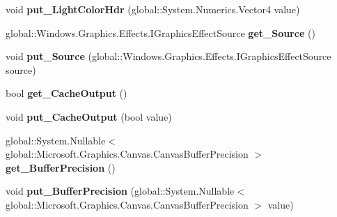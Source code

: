\begin{DoxyCompactItemize}
void {\bfseries put\+\_\+\+Light\+Color\+Hdr} (global\+::\+System.\+Numerics.\+Vector4 value)
\item 
\mbox{\label{class_microsoft_1_1_graphics_1_1_canvas_1_1_effects_1_1_distant_diffuse_effect_a281ce3e909dbd3d657de772dd7cf9a88}} 
global\+::\+Windows.\+Graphics.\+Effects.\+I\+Graphics\+Effect\+Source {\bfseries get\+\_\+\+Source} ()
\item 
\mbox{\label{class_microsoft_1_1_graphics_1_1_canvas_1_1_effects_1_1_distant_diffuse_effect_ae46b17e7bfeb38d1a8a97d17417e0b44}} 
void {\bfseries put\+\_\+\+Source} (global\+::\+Windows.\+Graphics.\+Effects.\+I\+Graphics\+Effect\+Source source)
\item 
\mbox{\label{class_microsoft_1_1_graphics_1_1_canvas_1_1_effects_1_1_distant_diffuse_effect_ad2e1204fd4a5c7fc0fd34308e55a8e9d}} 
bool {\bfseries get\+\_\+\+Cache\+Output} ()
\item 
\mbox{\label{class_microsoft_1_1_graphics_1_1_canvas_1_1_effects_1_1_distant_diffuse_effect_afa1c000af71fd3890693cc34c38419c1}} 
void {\bfseries put\+\_\+\+Cache\+Output} (bool value)
\item 
\mbox{\label{class_microsoft_1_1_graphics_1_1_canvas_1_1_effects_1_1_distant_diffuse_effect_ac89cdd4b51db6b60cc4c4aeae373a36a}} 
global\+::\+System.\+Nullable$<$ global\+::\+Microsoft.\+Graphics.\+Canvas.\+Canvas\+Buffer\+Precision $>$ {\bfseries get\+\_\+\+Buffer\+Precision} ()
\item 
\mbox{\label{class_microsoft_1_1_graphics_1_1_canvas_1_1_effects_1_1_distant_diffuse_effect_a698bfa7917dc105cb05a49925a232e37}} 
void {\bfseries put\+\_\+\+Buffer\+Precision} (global\+::\+System.\+Nullable$<$ global\+::\+Microsoft.\+Graphics.\+Canvas.\+Canvas\+Buffer\+Precision $>$ value)
\item 
\mbox{\label{class_microsoft_1_1_graphics_1_1_canvas_1_1_effects_1_1_distant_diffuse_effect_a570cd2d714129e1f0f41f06209aba807}} 

\end{DoxyCompactItemize}
